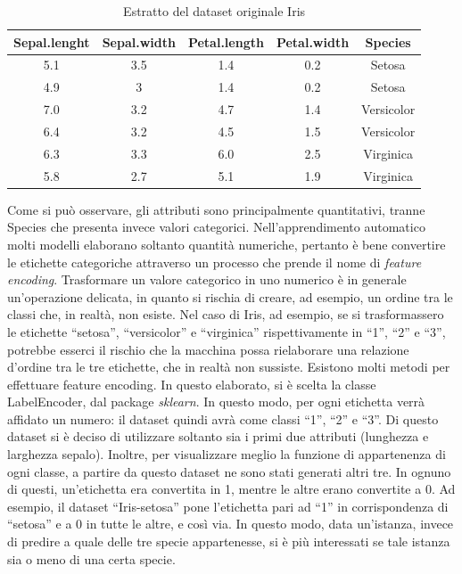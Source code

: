 \documentclass[11pt,  oneside, openany]{book}
\begin{document}
\begin{table} [h!]
    \centering 
    \begin{tabular}{|c|c|c|c|c|}
    \hline
        \textbf{Sepal.lenght} & \textbf{Sepal.width} & \textbf{Petal.length} & \textbf{Petal.width} & \textbf{Species} \\ \hline
        	5.1 	& 3.5 		& 1.4 		& 0.2 		&Setosa\\ 
	4.9 	& 3 		& 1.4 		& 0.2 		&Setosa \\ 
	7.0	& 3.2		& 4.7		&1.4		&Versicolor\\ 
	6.4	& 3.2		& 4.5		&1.5		&Versicolor\\
	6.3	&3.3		&6.0		&2.5		&Virginica\\ 
	5.8	&2.7		&5.1		&1.9		&Virginica\\ \hline	
   \end{tabular}
\caption{Estratto del dataset originale Iris}
\label{table:3}
\end{table}

Come si può osservare, gli attributi sono principalmente quantitativi, tranne Species che presenta invece valori categorici. Nell'apprendimento automatico molti modelli elaborano soltanto quantità numeriche, pertanto è bene convertire le etichette categoriche attraverso un processo che prende il nome di \textit{feature encoding}. Trasformare un valore categorico in uno numerico è in generale un'operazione delicata, in quanto si rischia di creare, ad esempio, un ordine tra le classi che, in realtà, non esiste. Nel caso di Iris, ad esempio, se si trasformassero le etichette  ``setosa'', ``versicolor'' e ``virginica'' rispettivamente in ``1'', ``2'' e ``3'', potrebbe esserci il rischio che la macchina possa rielaborare una relazione d'ordine tra le tre etichette, che in realtà non sussiste. Esistono molti metodi per effettuare feature encoding. In questo elaborato, si è scelta la classe LabelEncoder, dal package \textit{sklearn}. In questo modo, per ogni etichetta verrà affidato un numero: il dataset quindi avrà come classi ``1'', ``2'' e ``3''. Di questo dataset si è deciso di utilizzare soltanto sia i primi due attributi (lunghezza e larghezza sepalo). Inoltre, per visualizzare meglio la funzione di appartenenza di ogni classe, a partire da questo dataset ne sono stati generati altri tre. In ognuno di questi, un'etichetta era convertita in 1, mentre le altre erano convertite a 0. Ad esempio, il dataset ``Iris-setosa'' pone l'etichetta pari ad ``1'' in corrispondenza di ``setosa'' e a 0 in tutte le altre, e così via. 
 In questo modo, data un'istanza, invece di predire a quale delle tre specie appartenesse, si è più interessati se tale istanza sia o meno di una certa specie. 
\end{document}
